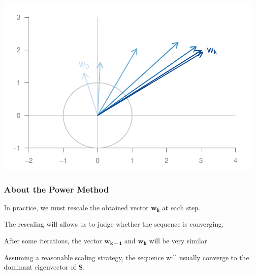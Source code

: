 \documentclass[12pt]{beamer}\usepackage[]{graphicx}\usepackage[]{color}
\makeatletter
\def\maxwidth{ %
  \ifdim\Gin@nat@width>\linewidth
    \linewidth
  \else
    \Gin@nat@width
  \fi
}
\newenvironment{knitrout}{}{} %
\makeatother
\begin{document}

\begin{frame}[fragile]

\begin{knitrout}\footnotesize
{}\color{fgcolor}

{\centering \includegraphics[width=\maxwidth]{figure/power-method-example-1} 

}



\end{knitrout}

\end{frame}


\begin{frame}
\frametitle{About the Power Method}

\bbi
  \item In practice, we must rescale the obtained vector $\mathbf{w_k}$ at each step.
  \item The rescaling will allows us to judge whether the sequence is converging.
  \item After some iterations, the vector $\mathbf{w_{k-1}}$ and $\mathbf{w_k}$ will be very similar
  \item Assuming a reasonable scaling strategy, the sequence will usually converge 
  to the dominant eigenvector of $\mathbf{S}$.
\ei

\end{frame}

\end{document}

